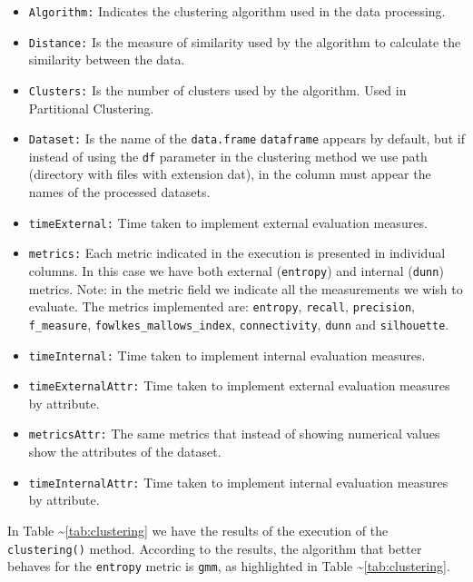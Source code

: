 \documentclass[
]{article}
\providecommand{\tightlist}{%
  \setlength{\itemsep}{0pt}\setlength{\parskip}{0pt}}
\begin{document}
\begin{itemize}
\tightlist
\item
  \texttt{Algorithm:} Indicates the clustering algorithm used in the
  data processing.

  \item

  \texttt{Distance:} Is the measure of similarity used by the algorithm
  to calculate the similarity between the data.
\item
  \texttt{Clusters:} Is the number of clusters used by the algorithm.
  Used in Partitional Clustering.
\item
  \texttt{Dataset:} Is the name of the \texttt{data.frame}
  \texttt{dataframe} appears by default, but if instead of using the
  \texttt{df} parameter in the clustering method we use path (directory
  with files with extension dat), in the column must appear the names of
  the processed datasets.
\item
  \texttt{timeExternal:} Time taken to implement external evaluation
  measures.
\item
  \texttt{metrics:} Each metric indicated in the execution is presented
  in individual columns. In this case we have both external
  (\texttt{entropy}) and internal (\texttt{dunn}) metrics. Note: in the
  metric field we indicate all the measurements we wish to evaluate. The
  metrics implemented are: \texttt{entropy}, \texttt{recall},
  \texttt{precision}, \texttt{f\_measure},
  \texttt{fowlkes\_mallows\_index}, \texttt{connectivity}, \texttt{dunn}
  and \texttt{silhouette}.
\item
  \texttt{timeInternal:} Time taken to implement internal evaluation
  measures.
\item
  \texttt{timeExternalAttr:} Time taken to implement external evaluation
  measures by attribute.
\item
  \texttt{metricsAttr:} The same metrics that instead of showing
  numerical values show the attributes of the dataset.
\item
  \texttt{timeInternalAttr:} Time taken to implement internal evaluation
  measures by attribute.
\end{itemize}

In Table \textasciitilde{}\ref{tab:clustering} we have the results of
the execution of the \texttt{clustering()} method. According to the
results, the algorithm that better behaves for the \texttt{entropy}
metric is \texttt{gmm}, as highlighted in Table
\textasciitilde{}\ref{tab:clustering}.\\
\clearpage
\end{document}
